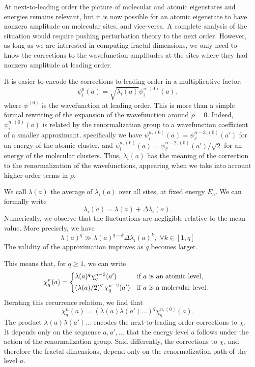 \documentclass[aps,prl,preprint]{revtex4-1}
\begin{document}
At next-to-leading order the picture of molecular and atomic eigenstates and energies remains relevant, but it is now possible for an atomic eigenstate to have nonzero amplitude on molecular sites, and vice-versa.
A complete analysis of the situation would require pushing perturbation theory to the next order.
However, as long as we are interested in computing fractal dimensions, we only need to know the corrections to the wavefunction amplitudes at the sites where they had nonzero amplitude at leading order.

It is easier to encode the corrections to leading order in a multiplicative factor:
\begin{equation}
	\psi_i^n(a) = \sqrt{\lambda_i(a)} \psi^{n,(0)}_i(a),
\end{equation}
where $\psi^{(0)}$ is the wavefunction at leading order. This is more than a simple formal rewriting of the expansion of the wavefunction around $\rho = 0$. Indeed, $\psi^{n,(0)}_i(a)$ is related by the renormalization group to a wavefunction coefficient of a smaller approximant.
specifically we have $\psi^{n,(0)}_i(a) = \psi^{n-3,(0)}_{i'}(a')$ for an energy of the atomic cluster, and $\psi^{n,(0)}_i(a) = \psi^{n-2,(0)}_{i'}(a')/\sqrt{2}$ for an energy of the molecular clusters.
Thus, $\lambda_i(a)$ has the meaning of the correction to the renormalization of the wavefunctions, appearing when we take into account higher order terms in $\rho$. 

We call $\lambda(a)$ the average of $\lambda_i(a)$ over all sites, at fixed energy $E_a$.
We can formally write
\begin{equation}
	\lambda_i(a) = \lambda(a) + \Delta \lambda_i(a).
\end{equation}
Numerically, we observe that the fluctuations are negligible relative to the mean value. More precisely, we have
\begin{equation}
	\lambda(a)^q \gg \lambda(a)^{q-k} \Delta \lambda_i(a)^k, \text{~} \forall k \in [1,q]
\end{equation}
The validity of the approximation improves as $q$ becomes larger.

This means that, for $q \geq 1$, we can write
\begin{equation}
	\chi_q^n(a) = \begin{cases*}
	\lambda(a)^q \chi_q^{n-3}(a') & if $a$ is an atomic level, \\
	\left(\lambda(a)/2\right)^q \chi_q^{n-2}(a') & if $a$ is a molecular level. \\
	\end{cases*}
\end{equation}
Iterating this recurrence relation, we find that 
\begin{equation}
\label{eq:rec_chi}
	\chi_q^n(a) = \left( \lambda(a) \lambda(a')... \right)^q \chi_q^{n,(0)}(a).
\end{equation}
The product $\lambda(a)\lambda(a')...$ encodes the next-to-leading order corrections to $\chi$. 
It depends only on the sequence $a, a', ...$ that the energy level $a$ follows under the action of the renormalization group.
Said differently, the corrections to $\chi$, and therefore the fractal dimensions, depend only on the renormalization path of the level $a$.
\end{document}
